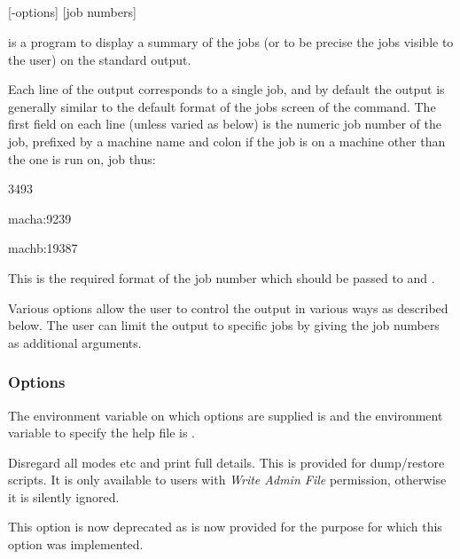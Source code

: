 \subsection{\BtjlistName}

\begin{expara}

\BtjlistName{} [-options] [job numbers]

\end{expara}

\PrBtjlist{} is a program to display a summary of the jobs (or to be precise the jobs visible to the user) on the standard output.

Each line of the output corresponds to a single job, and by default the output is generally similar to the default format of the jobs screen of
the \PrBtq{} command. The first field on each line (unless varied as below) is the numeric job number of the job, prefixed
by a machine name and colon if the job is on a machine other than the one \BtjlistName{} is run on, job thus:

\begin{expara}

3493

macha:9239

machb:19387

\end{expara}

This is the required format of the job number which should be passed to \PrBtjdel{} and \PrBtjchange{}.

Various options allow the user to control the output in various ways as described below. The user can limit the output to specific jobs by
giving the job numbers as additional arguments.

\subsubsection{Options}
The environment variable on which options are supplied is \filename{\BtjlistVarname} and the environment variable to specify the
help file is .

\explainopt


Disregard all modes etc and print full details. This is provided for dump/restore scripts. It is only available to users with
\textit{Write Admin File} permission, otherwise it is silently ignored.

This option is now deprecated as \PrXbCjlist{} is now provided for the purpose for which this option was implemented.


